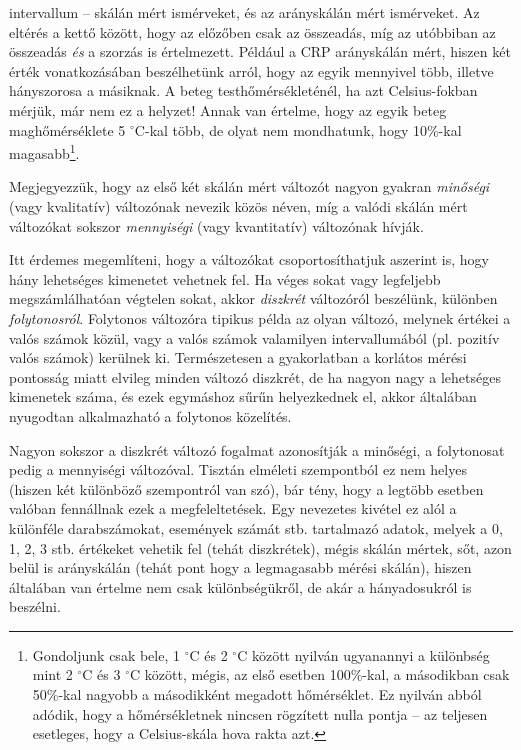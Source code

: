 \documentclass[]{book}
\let\rmarkdownfootnote\footnote%
\def\footnote{\protect\rmarkdownfootnote}
\begin{document}
\begin{enumerate}
  intervallum -- skálán mért ismérveket, és az arányskálán mért
  ismérveket. Az eltérés a kettő között, hogy az előzőben csak az
  összeadás, míg az utóbbiban az összeadás \emph{és} a szorzás is
  értelmezett. Például a CRP arányskálán mért, hiszen két érték
  vonatkozásában beszélhetünk arról, hogy az egyik mennyivel több,
  illetve hányszorosa a másiknak. A beteg testhőmérsékleténél, ha azt
  Celsius-fokban mérjük, már nem ez a helyzet! Annak van értelme, hogy
  az egyik beteg maghőmérséklete 5 \(^\circ\)C-kal több, de olyat nem
  mondhatunk, hogy 10\%-kal
  magasabb\footnote{Gondoljunk csak bele, 1 $^\circ$C és 2 $^\circ$C között nyilván ugyanannyi a különbség mint 2 $^\circ$C és 3 $^\circ$C között, mégis, az első esetben 100\%-kal, a másodikban csak 50\%-kal nagyobb a másodikként megadott hőmérséklet. Ez nyilván abból adódik, hogy a hőmérsékletnek nincsen rögzített nulla pontja -- az teljesen esetleges, hogy a Celsius-skála hova rakta azt.}.
\end{enumerate}

Megjegyezzük, hogy az első két skálán mért változót nagyon gyakran
\emph{minőségi} (vagy kvalitatív) változónak nevezik közös néven, míg a
valódi skálán mért változókat sokszor \emph{mennyiségi} (vagy
kvantitatív) változónak hívják.

Itt érdemes megemlíteni, hogy a változókat csoportosíthatjuk aszerint
is, hogy hány lehetséges kimenetet vehetnek fel. Ha véges sokat vagy
legfeljebb megszámlálhatóan végtelen sokat, akkor \emph{diszkrét}
változóról beszélünk, különben \emph{folytonosról}. Folytonos változóra
tipikus példa az olyan változó, melynek értékei a valós számok közül,
vagy a valós számok valamilyen intervallumából (pl. pozitív valós
számok) kerülnek ki. Természetesen a gyakorlatban a korlátos mérési
pontosság miatt elvileg minden változó diszkrét, de ha nagyon nagy a
lehetséges kimenetek száma, és ezek egymáshoz sűrűn helyezkednek el,
akkor általában nyugodtan alkalmazható a folytonos közelítés.

Nagyon sokszor a diszkrét változó fogalmat azonosítják a minőségi, a
folytonosat pedig a mennyiségi változóval. Tisztán elméleti szempontból
ez nem helyes (hiszen két különböző szempontról van szó), bár tény, hogy
a legtöbb esetben valóban fennállnak ezek a megfeleltetések. Egy
nevezetes kivétel ez alól a különféle darabszámokat, események számát
stb. tartalmazó adatok, melyek a 0, 1, 2, 3 stb. értékeket vehetik fel
(tehát diszkrétek), mégis skálán mértek, sőt, azon belül is arányskálán
(tehát pont hogy a legmagasabb mérési skálán), hiszen általában van
értelme nem csak különbségükről, de akár a hányadosukról is beszélni.
\end{document}
